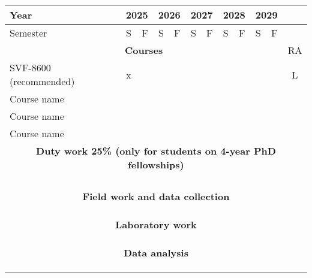 \begin{tabularx}{\textwidth}{|X|c|c|c|c|c|c|c|c|c|c|c|}
    \hline
    Year & \multicolumn{2}{c|}{2025} & \multicolumn{2}{c|}{2026} & \multicolumn{2}{c|}{2027}  & \multicolumn{2}{c|}{2028} & \multicolumn{2}{c|}{2029} & \\
    \hline 
    Semester & S & F & S & F & S & F & S & F & S & F & \\
    \hline

    \multicolumn{11}{|c|}{\textbf{Courses}} & \cellcolor{yellow}RA \\
    \hline
    SVF-8600 (recommended) & x & & & & & & & & & & L \\
    \hline
    Course name & & & & & & & & & & & \\
    \hline
    Course name & & & & & & & & & & & \\
    \hline
    Course name & & & & & & & & & & & \\
    \hline

    \multicolumn{12}{|c|}{\textbf{Duty work 25\% (only for students on 4-year PhD fellowships)}} \\
    \hline
    & & & & & & & & & & & \\
    \hline
    & & & & & & & & & & & \\
    \hline
    & & & & & & & & & & & \\
    \hline
    & & & & & & & & & & & \\
    \hline

    \multicolumn{12}{|c|}{\textbf{Field work and data collection}} \\
    \hline
    & & & & & & & & & & & \\
    \hline
    & & & & & & & & & & & \\
    \hline
    & & & & & & & & & & & \\
    \hline

    \multicolumn{12}{|c|}{\textbf{Laboratory work}} \\
    \hline
    & & & & & & & & & & & \\
    \hline
    & & & & & & & & & & & \\
    \hline
    & & & & & & & & & & & \\
    \hline

    \multicolumn{12}{|c|}{\textbf{Data analysis}} \\
    \hline
    & & & & & & & & & & & \\
    \hline
    & & & & & & & & & & & \\
    \hline
    & & & & & & & & & & & \\
    \hline


\end{tabularx}
